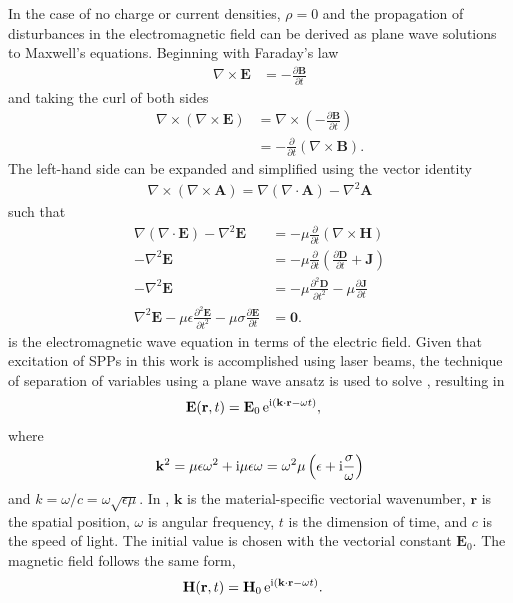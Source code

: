In the case of no charge or current densities, $\rho=0$ and
the propagation of disturbances in the electromagnetic field can be derived
as plane wave solutions to Maxwell's equations.  Beginning with Faraday's law
\begin{align}
\nabla \times \mathbf{E} &= -\frac{\partial \mathbf{B}} {\partial t}
\end{align}
and taking the curl of both sides
\begin{align}
\nabla \times
\left(\nabla\times\mathbf{E}\right)&=\nabla\times\left(-\frac{\partial\mathbf{B}}{\partial
t}\right)\\
&=-\frac{\partial}{\partial t}\left(\nabla \times \mathbf{B}\right).
\end{align}
The left-hand side can be expanded and simplified using the vector identity
\begin{align}
\nabla \times \left( \nabla \times \mathbf{A} \right) = \nabla \left(
\nabla \cdot \mathbf{A} \right) - \nabla^2 \mathbf{A}
\end{align}
such that
\begin{align}
\nabla\left(\nabla\cdot\mathbf{E}\right)-\nabla^2\mathbf{E}
&=-\mu\frac{\partial}{\partial t}\left(\nabla \times \mathbf{H}\right)\\
-\nabla^2\mathbf{E}&=-\mu\frac{\partial}{\partial t}\left( \frac{\partial \mathbf{D}}{\partial t} + \mathbf{J}\right) \\
-\nabla^2\mathbf{E}&=-\mu\frac{\partial^2 \mathbf{D}}{\partial t^2} -\mu\frac{\partial\mathbf{J}}{\partial t} \\
\nabla^2\mathbf{E} -\mu\epsilon\frac{\partial^2 \mathbf{E}}{\partial t^2} -\mu\sigma\frac{\partial\mathbf{E}}{\partial t}  &= \mathbf{0}.
\label{eqn:ewe}
\end{align}
 is the electromagnetic wave equation in terms of the
electric field.  Given that excitation of SPPs in this work is accomplished
using laser beams, the technique of separation of variables using a plane
wave ansatz is used to solve , resulting in
\begin{align}
 \mathbf{E} ( \mathbf{r}, t ) &= \mathbf{E}_0\, {\mathrm{e}}^{{\mathrm{i}} (\mathbf{k}
 \cdot \mathbf{r} - \omega t )},
\label{eqn:planewaves}
\end{align}
where
\begin{equation}
 \mathbf{k}^2 = \mu \epsilon \omega^2 + {\mathrm{i}} \mu \epsilon \omega = \omega^2 \mu \left(\epsilon + {\mathrm{i}} \frac{\sigma}{\omega}\right)
\label{eqn:planewavedispersion}
\end{equation}
and $k=\omega/c=\omega\sqrt{\epsilon\mu}$.  In ,
$\mathbf{k}$ is the material-specific vectorial wavenumber, $\mathbf{r}$ is the
spatial position, $\omega$ is angular frequency, $t$ is
the dimension of time, and $c$ is the speed of light.
The initial value is chosen with the vectorial constant $\mathbf{E}_0$.
The magnetic field follows the same form,
\begin{align}
 \mathbf{H} ( \mathbf{r}, t ) &= \mathbf{H}_0\, {\mathrm{e}}^{{\mathrm{i}} (\mathbf{k}
 \cdot \mathbf{r} - \omega t )}.
	\label{eqn:planewavesh}
\end{align}

